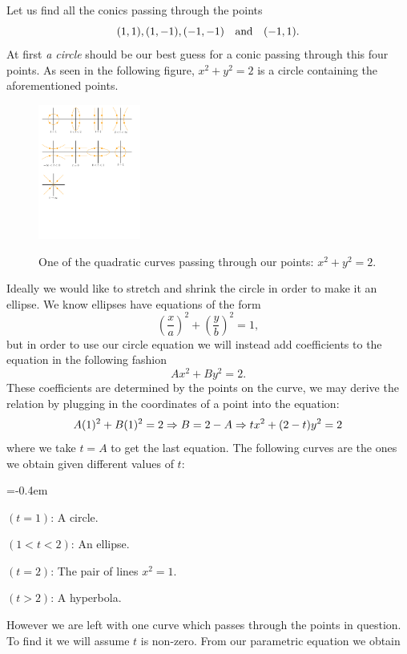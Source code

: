 \documentclass[12pt]{memoir}
\begin{document}
\begin{Ex}
    Let us find all the conics passing through the points 
    $$(1,1),(1,-1),(-1,-1)\quad\text{and}\quad(-1,1).$$At first \emph{a circle} should be our best guess for a conic passing through this four points. As seen in the following figure, $x^2+y^2=2$ is a circle containing the aforementioned points.
    \begin{figure}[h!]
        \centering
        \includegraphics[width=0.3\textwidth, trim= 0.8cm 22.9cm 16cm 0.6cm,clip]{figs/fig1Intro.pdf}
        \label{fig1Intro}
        \caption{One of the quadratic curves passing through our points: $x^2+y^2=2$.}
    \end{figure}\newpage
    Ideally we would like to stretch and shrink the circle in order to make it an ellipse. We know ellipses have equations of the form 
    $$\left(\frac xa\right)^2+\left(\frac yb\right)^2=1,$$ 
    but in order to use our circle equation we will instead add coefficients to the equation in the following fashion
    $$Ax^2+By^2=2.$$
    These coefficients are determined by the points on the curve, we may derive the relation by plugging in the coordinates of a point into the equation:
    $$A(1)^2+B(1)^2=2\Rightarrow B=2-A\Rightarrow tx^2+(2-t)y^2=2$$
    where we take $t=A$ to get the last equation.
    The following curves are the ones we obtain given different values of $t$:
    \vspace{-0.5em}
    \begin{itemize}
        \begin{multicols}{2}
            \itemsep=-0.4em
        \item $(t=1)$: A circle.
        \item $(1<t<2)$: An ellipse.
        \item $(t=2)$: The pair of lines $x^2=1$.
        \item $(t>2)$: A hyperbola.
        \end{multicols}
    \end{itemize}
    However we are left with one curve which passes through the points in question. To find it we will assume $t$ is non-zero. From our parametric equation we obtain 

\end{Ex}
\end{document}
